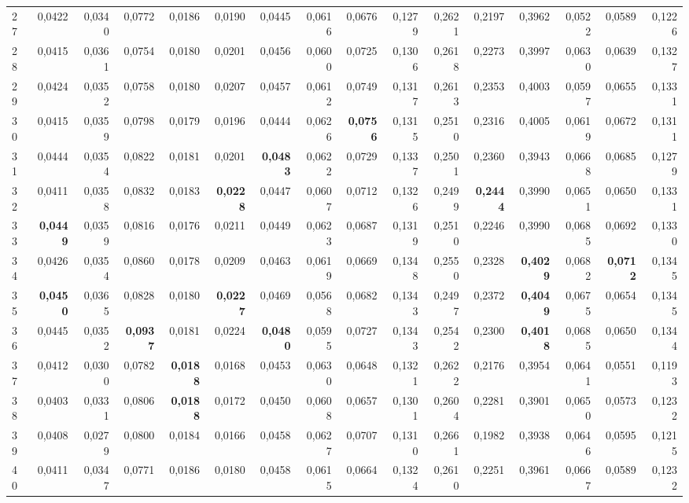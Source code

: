 \begin{table}[htp!]
\begin{adjustwidth}{-2cm}{}
\begin{tabular}{ l | *{15}{| r}}
27	&	0,0422	&	0,0340	&	0,0772	&	0,0186	&	0,0190	&	0,0445	&	0,0616	&	0,0676	&	0,1279	&	0,2621	&	0,2197	&	0,3962	&	0,0522	&	0,0589	&	0,1226	\\
28	&	0,0415	&	0,0361	&	0,0754	&	0,0180	&	0,0201	&	0,0456	&	0,0600	&	0,0725	&	0,1306	&	0,2618	&	0,2273	&	0,3997	&	0,0630	&	0,0639	&	0,1327	\\
29	&	0,0424	&	0,0352	&	0,0758	&	0,0180	&	0,0207	&	0,0457	&	0,0612	&	0,0749	&	0,1317	&	0,2613	&	0,2353	&	0,4003	&	0,0597	&	0,0655	&	0,1331	\\
30	&	0,0415	&	0,0359	&	0,0798	&	0,0179	&	0,0196	&	0,0444	&	0,0626	&	\textbf{0,0756}	&	0,1315	&	0,2510	&	0,2316	&	0,4005	&	0,0619	&	0,0672	&	0,1311	\\
31	&	0,0444	&	0,0354	&	0,0822	&	0,0181	&	0,0201	&	\textbf{0,0483}	&	0,0622	&	0,0729	&	0,1337	&	0,2501	&	0,2360	&	0,3943	&	0,0668	&	0,0685	&	0,1279	\\
32	&	0,0411	&	0,0358	&	0,0832	&	0,0183	&	\textbf{0,0228}	&	0,0447	&	0,0607	&	0,0712	&	0,1326	&	0,2499	&	\textbf{0,2444}	&	0,3990	&	0,0651	&	0,0650	&	0,1331	\\
33	&	\textbf{0,0449}	&	0,0359	&	0,0816	&	0,0176	&	0,0211	&	0,0449	&	0,0623	&	0,0687	&	0,1319	&	0,2510	&	0,2246	&	0,3990	&	0,0685	&	0,0692	&	0,1330	\\
34	&	0,0426	&	0,0354	&	0,0860	&	0,0178	&	0,0209	&	0,0463	&	0,0619	&	0,0669	&	0,1348	&	0,2550	&	0,2328	&	\textbf{0,4029}	&	0,0682	&	\textbf{0,0712}	&	0,1345	\\
35	&	\textbf{0,0450}	&	0,0365	&	0,0828	&	0,0180	&	\textbf{0,0227}	&	0,0469	&	0,0568	&	0,0682	&	0,1343	&	0,2497	&	0,2372	&	\textbf{0,4049}	&	0,0675	&	0,0654	&	0,1345	\\
36	&	0,0445	&	0,0352	&	\textbf{0,0937}	&	0,0181	&	0,0224	&	\textbf{0,0480}	&	0,0595	&	0,0727	&	0,1343	&	0,2542	&	0,2300	&	\textbf{0,4018}	&	0,0685	&	0,0650	&	0,1344	\\
37	&	0,0412	&	0,0300	&	0,0782	&	\textbf{0,0188}	&	0,0168	&	0,0453	&	0,0630	&	0,0648	&	0,1321	&	0,2622	&	0,2176	&	0,3954	&	0,0641	&	0,0551	&	0,1193	\\
38	&	0,0403	&	0,0331	&	0,0806	&	\textbf{0,0188}	&	0,0172	&	0,0450	&	0,0608	&	0,0657	&	0,1301	&	0,2604	&	0,2281	&	0,3901	&	0,0650	&	0,0573	&	0,1232	\\
39	&	0,0408	&	0,0279	&	0,0800	&	0,0184	&	0,0166	&	0,0458	&	0,0627	&	0,0707	&	0,1310	&	0,2661	&	0,1982	&	0,3938	&	0,0646	&	0,0595	&	0,1215	\\
40	&	0,0411	&	0,0347	&	0,0771	&	0,0186	&	0,0180	&	0,0458	&	0,0615	&	0,0664	&	0,1324	&	0,2610	&	0,2251	&	0,3961	&	0,0667	&	0,0589	&	0,1232	\\

\end{tabular}
\end{adjustwidth}
\end{table}
